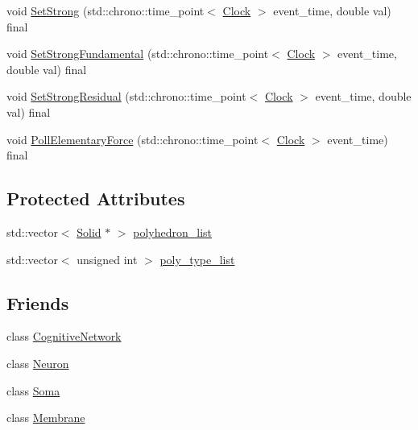 \begin{DoxyCompactItemize}
\item 
void \hyperlink{class_solid_a478e15cdf15c5bb01cbcbd5f584ef83a}{Set\+Strong} (std\+::chrono\+::time\+\_\+point$<$ \hyperlink{universe_8h_a0ef8d951d1ca5ab3cfaf7ab4c7a6fd80}{Clock} $>$ event\+\_\+time, double val) final
\item 
void \hyperlink{class_solid_a4342786a7785b1a3816d20de02105bcf}{Set\+Strong\+Fundamental} (std\+::chrono\+::time\+\_\+point$<$ \hyperlink{universe_8h_a0ef8d951d1ca5ab3cfaf7ab4c7a6fd80}{Clock} $>$ event\+\_\+time, double val) final
\item 
void \hyperlink{class_solid_a8b80ebe209fcd3afa4791968127753d0}{Set\+Strong\+Residual} (std\+::chrono\+::time\+\_\+point$<$ \hyperlink{universe_8h_a0ef8d951d1ca5ab3cfaf7ab4c7a6fd80}{Clock} $>$ event\+\_\+time, double val) final
\item 
void \hyperlink{class_solid_ae2a486e59f11f96a1a39756b3f3da53f}{Poll\+Elementary\+Force} (std\+::chrono\+::time\+\_\+point$<$ \hyperlink{universe_8h_a0ef8d951d1ca5ab3cfaf7ab4c7a6fd80}{Clock} $>$ event\+\_\+time) final
\end{DoxyCompactItemize}
\subsection*{Protected Attributes}
\begin{DoxyCompactItemize}
\item 
std\+::vector$<$ \hyperlink{class_solid}{Solid} $\ast$ $>$ \hyperlink{class_solid_a67ef5cdd87e5629159660fa9bb5833c8}{polyhedron\+\_\+list}
\item 
std\+::vector$<$ unsigned int $>$ \hyperlink{class_solid_ad63206ff20f38b621db482b01801c4c5}{poly\+\_\+type\+\_\+list}
\end{DoxyCompactItemize}
\subsection*{Friends}
\begin{DoxyCompactItemize}
\item 
class \hyperlink{class_solid_ad04bbaef84caa0d408ec09a1c1302f5f}{Cognitive\+Network}
\item 
class \hyperlink{class_solid_aa410d74ba34b18a9f6bdf24323c4ee5b}{Neuron}
\item 
class \hyperlink{class_solid_aaa07b7b364b620b9a781f30a5cd9f5ea}{Soma}
\item 
class \hyperlink{class_solid_ac790db405644a01723104c3c0c8128bb}{Membrane}
\end{DoxyCompactItemize}
